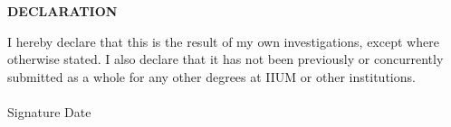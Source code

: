 \documentclass[12pt, a4paper]{memoir}
\begin{document}
\thispagestyle{empty}


\begin{center}
\fontsize{14bp}{16bp}
\textbf{\MakeUppercase{Declaration}}\\[24bp]
\end{center}

\noindent I hereby declare that this \myDocument is the result of my own 
investigations, 
except where otherwise stated. I also declare that it has not been previously 
or concurrently submitted as a whole for any other degrees at IIUM or other 
institutions.\\[24pt]

\noindent\myName\\[24pt]

\noindent Signature \makebox[2in]{\dotfill}
\hfill
\noindent Date \makebox[1.5in]{\dotfill}
\end{document}
